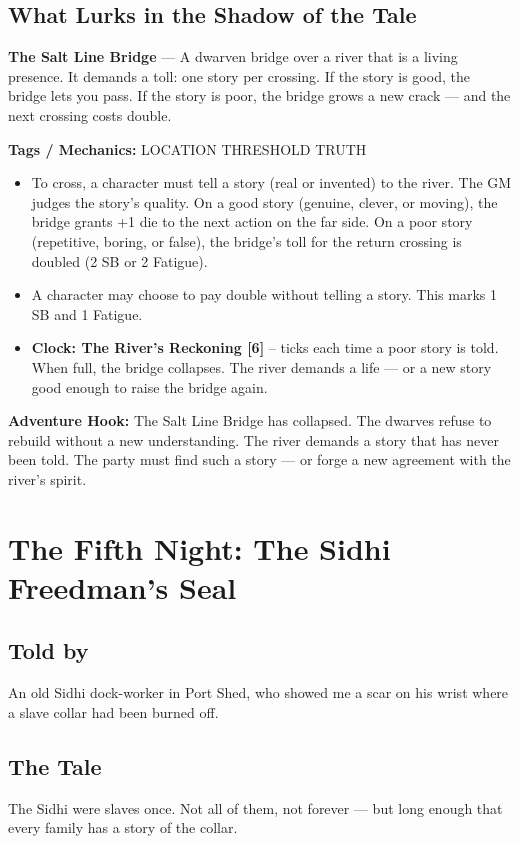 \documentclass[10pt,twoside]{book}
\newcommand{\tag}[1]{\textsc{#1}}
\begin{document}
\section*{What Lurks in the Shadow of the Tale}
\begin{infobox}
\textbf{The Salt Line Bridge} --- A dwarven bridge over a river that is a living presence. It demands a toll: one story per crossing. If the story is good, the bridge lets you pass. If the story is poor, the bridge grows a new crack --- and the next crossing costs double.

\textbf{Tags / Mechanics:} \tag{LOCATION} \tag{THRESHOLD} \tag{TRUTH}

\begin{itemize}
\item To cross, a character must tell a story (real or invented) to the river. The GM judges the story's quality. On a good story (genuine, clever, or moving), the bridge grants +1 die to the next action on the far side. On a poor story (repetitive, boring, or false), the bridge's toll for the return crossing is doubled (2 SB or 2 Fatigue).
\item A character may choose to pay double without telling a story. This marks 1 SB and 1 Fatigue.
\item \textbf{Clock: The River's Reckoning [6]} -- ticks each time a poor story is told. When full, the bridge collapses. The river demands a life --- or a new story good enough to raise the bridge again.
\end{itemize}

\textbf{Adventure Hook:} The Salt Line Bridge has collapsed. The dwarves refuse to rebuild without a new understanding. The river demands a story that has never been told. The party must find such a story --- or forge a new agreement with the river's spirit.
\end{infobox}

\chapter{The Fifth Night: The Sidhi Freedman's Seal}

\section*{Told by}
An old Sidhi dock-worker in Port Shed, who showed me a scar on his wrist where a slave collar had been burned off.

\section*{The Tale}
The Sidhi were slaves once. Not all of them, not forever --- but long enough that every family has a story of the collar.
\end{document}
